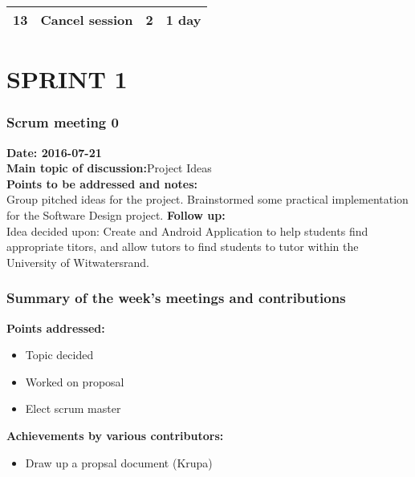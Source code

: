 \documentclass[12pt]{article}
\begin{document}
{{\begin{longtable}{| p{1.5cm} | p{8cm}| p{2cm}| p{3cm} |}
13 & Cancel session  & 2 & 1 day \\ \hline	

	
\end{longtable}
}

\section{SPRINT 1}
\subsubsection{Scrum meeting 0}
\textbf{Date: 2016-07-21}\\
\textbf{Main topic of discussion:}Project Ideas\\
\textbf{Points to be addressed and notes:}\\
Group pitched ideas for the project. Brainstormed some practical implementation for the Software Design project. 
\textbf{Follow up:}\\
Idea decided upon: Create and Android Application to help students find appropriate titors, and allow tutors to find students to tutor within the University of Witwatersrand. 
\subsubsection{Summary of the week's meetings and contributions}
\textbf{Points addressed:}
\begin{itemize}
\item Topic decided
\item Worked on proposal
\item Elect scrum master
\end{itemize}
\textbf{Achievements by various contributors:}
\begin{itemize}
\item Draw up a propsal document (Krupa)
\end{itemize}

}
\end{document}
